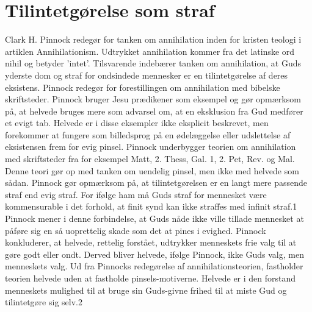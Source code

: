 \section{Tilintetgørelse som straf}
Clark H. Pinnock redegør for tanken om annihilation inden for kristen teologi i artiklen Annihilationism. Udtrykket annihilation kommer fra det latinske ord nihil og betyder ’intet’. Tilsvarende indebærer tanken om annihilation, at Guds yderste dom og straf for ondsindede mennesker er en tilintetgørelse af deres eksistens. Pinnock redegør for forestillingen om annihilation med bibelske skriftsteder. Pinnock bruger Jesu prædikener som eksempel og gør opmærksom på, at helvede bruges mere som advarsel om, at en eksklusion fra Gud medfører et evigt tab. Helvede er i disse eksempler ikke eksplicit beskrevet, men forekommer at fungere som billedsprog på en ødelæggelse eller udslettelse af eksistensen frem for evig pinsel. Pinnock underbygger teorien om annihilation med skriftsteder fra for eksempel Matt, 2. Thess, Gal. 1, 2. Pet, Rev. og Mal. Denne teori gør op med tanken om uendelig pinsel, men ikke med helvede som sådan. Pinnock gør opmærksom på, at tilintetgørelsen er en langt mere passende straf end evig straf. For ifølge ham må Guds straf for mennesket være kommensurable i det forhold, at finit synd kan ikke straffes med infinit straf.1 Pinnock mener i denne forbindelse, at Guds nåde ikke ville tillade mennesket at påføre sig en så uoprettelig skade som det at pines i evighed. Pinnock konkluderer, at helvede, rettelig forstået, udtrykker menneskets frie valg til at gøre godt eller ondt. Derved bliver helvede, ifølge Pinnock, ikke Guds valg, men menneskets valg. Ud fra Pinnocks redegørelse af annihilationsteorien, fastholder teorien helvede uden at fastholde pinsels-motiverne. Helvede er i den forstand menneskets mulighed til at bruge sin Guds-givne frihed til at miste Gud og tilintetgøre sig selv.2

